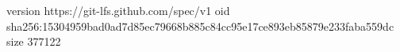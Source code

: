 version https://git-lfs.github.com/spec/v1
oid sha256:15304959bad0ad7d85ec79668b885c84cc95e17ce893eb85879e233faba559dc
size 377122
